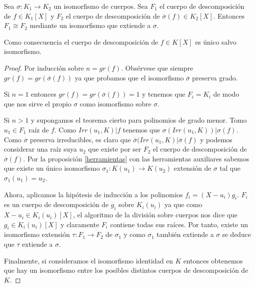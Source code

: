 \begin{theorem}
	Sea $\sigma:K_1 \to K_2$ un isomorfismo de cuerpos. Sea $F_1$ el cuerpo de descomposición de $f \in K_1[X]$ y $F_2$ el cuerpo de descomposición de $\overline{\sigma}(f) \in K_2[X]$. Entonces $F_1 \cong F_2$ mediante un isomorfismo que extiende a $\sigma$. 
	

	Como consecuencia el cuerpo de descomposición de $f \in K[X]$ es único salvo isomorfismo.
\end{theorem}
\begin{proof}
	Por inducción sobre $n = gr(f)$. Obsérvese que siempre $gr(f) = gr(\overline{\sigma}(f))$ ya que probamos que el isomorfismo $\overline{\sigma}$ preserva grado. 
	
	Si $n = 1$ entonces $gr(f) = gr(\overline{\sigma}(f)) = 1$ y tenemos que $F_i = K_i$ de modo que nos sirve el propio $\sigma$ como isomorfismo sobre $\sigma$. 
	
	Si $n > 1$ y supongamos el teorema cierto para polinomios de grado menor. Tomo $u_1 \in F_1$ raíz de $f$. Como $Irr(u_1,K)|f$ tenemos que $\sigma(Irr(u_1,K))|\sigma(f)$. Como $\overline{\sigma}$ preserva irreducibles, es claro que $\overline{\sigma}(Irr(u_1,K)|\overline{\sigma}(f)$ y podemos considerar una raíz suya $u_2$ que existe por ser $F_2$ el cuerpo de descomposición de $\overline{\sigma}(f)$. Por la proposición \ref{herramientas} con las herramientas auxiliares sabemos que existe un único isomorfismo $\sigma_1:K(u_1) \to K(u_2)$ extensión de $\sigma$ tal que $\sigma_1(u_1) = u_2$. 
	
	Ahora, aplicamos la hipótesis de inducción a los polinomios $f_i = (X-u_i)g_i$. $F_i$ es un cuerpo de descomposición de $g_i$ sobre $K_i(u_i)$ ya que como $X-u_i \in K_i(u_i)[X]$, el algoritmo de la división sobre cuerpos nos dice que $g_i \in K_i(u_i)[X]$ y claramente $F_i$ contiene todas sus raíces. Por tanto, existe un isomorfismo extensión $\tau:F_1 \to F_2$ de $\sigma_1$ y como $\sigma_1$ también extiende a $\sigma$ se deduce que $\tau$ extiende a $\sigma$. 
	
	Finalmente, si consideramos el isomorfismo identidad en $K$ entonces obtenemos que hay un isomorfismo entre los posibles distintos cuerpos de descomposición de $K$.
\end{proof}

